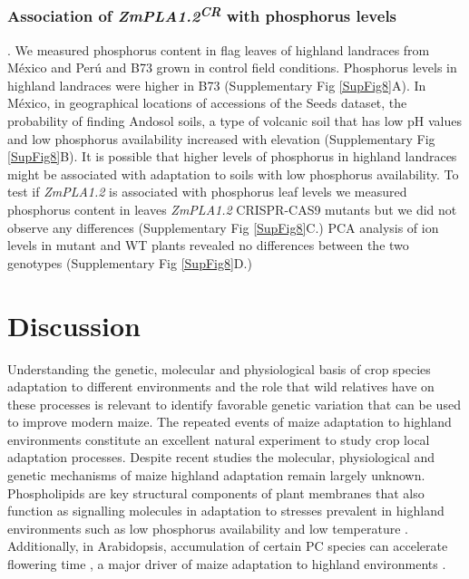 \documentclass[9pt,twocolumn,twoside]{BioRxiv}
\begin{document}
\subsubsection{Association of \textit{ZmPLA1.2\textsuperscript{CR}} with phosphorus levels}.
We measured phosphorus content in flag leaves of highland landraces from México and Perú and B73 grown in control field conditions. Phosphorus levels in highland landraces were higher in B73 (Supplementary Fig \ref{SupFig8}A). 
In México, in geographical locations of accessions of the Seeds dataset, the probability of finding Andosol soils, a type of volcanic soil that has low pH values and low phosphorus availability increased with elevation (Supplementary Fig \ref{SupFig8}B).
It is possible that higher levels of phosphorus in highland landraces might be associated with adaptation to soils with low phosphorus availability. 
To test if \textit{ZmPLA1.2} is associated with phosphorus leaf levels we measured phosphorus content in leaves \textit{ZmPLA1.2} CRISPR-CAS9 mutants but we did not observe any differences (Supplementary Fig \ref{SupFig8}C.) 
PCA analysis of ion levels in mutant and WT plants revealed no differences between the two genotypes (Supplementary Fig \ref{SupFig8}D.) 

\section{Discussion}
\label{sec:discussion}
Understanding the genetic, molecular and  physiological basis of crop species adaptation to different environments and the role that wild relatives have on these processes is relevant to identify favorable genetic variation that can be used to improve modern maize.
The repeated events of maize adaptation to highland environments constitute an excellent natural experiment to study crop local adaptation processes. 
Despite recent studies \cite{Wang2020-mp, Takuno2015-uj, Crow2020-gene} the molecular, physiological and genetic mechanisms of maize highland adaptation remain largely unknown.
Phospholipids are key structural components of plant membranes that also function as signalling molecules in adaptation to stresses prevalent in highland environments \cite{Ryu2004-iv, Nakamura2017-vb} such as low phosphorus availability \cite{Veneklaas2012-ls, Cruz-Ramirez2004-ib, Lambers2012-an} and low temperature \cite{Degenkolbe2012-wf, Welti2002-uk, Marla2017-ph}. 
Additionally, in Arabidopsis, accumulation of certain PC species can accelerate flowering time \cite{Nakamura2014-qf}, a major driver of maize adaptation to highland environments \cite{Romero_Navarro2017-cn, Gates2019-xu}.
 
\end{document}
